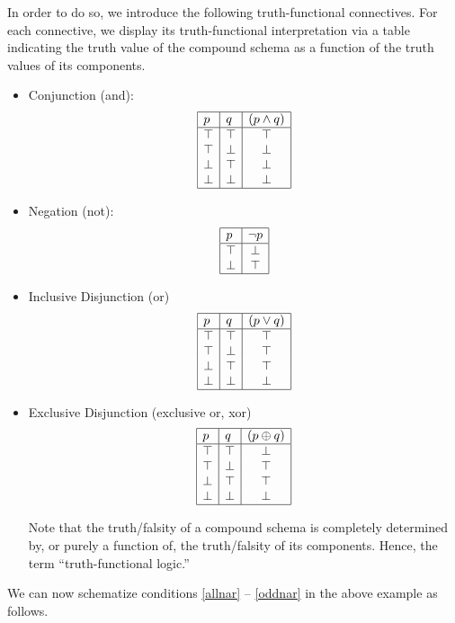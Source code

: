 In order to do so, we introduce the following truth-functional connectives. For each connective, we display its truth-functional interpretation via a table indicating the truth value of the compound schema as a function of the truth values of its components.
\begin{itemize}
\item Conjunction (and):
\[
\begin{array}{|l|l|c|} \hline
p   & q  &  (p \wedge q)   \\ \hline
\top & \top & \top  \\
\top & \bot & \bot  \\
\bot & \top & \bot  \\
\bot & \bot & \bot \\
\hline
\end{array}
\]
\item Negation (not):
\[
\begin{array}{|l|c|} \hline
p   &  \neg p    \\ \hline
\top & \bot  \\
\bot & \top  \\
\hline
\end{array}
\]
\item Inclusive Disjunction (or)
\[
\begin{array}{|l|l|c|} \hline
p   & q  &  (p \vee q)   \\ \hline
\top & \top & \top  \\
\top & \bot & \top  \\
\bot & \top & \top  \\   
\bot & \bot & \bot \\
\hline
\end{array}
\]

\item Exclusive Disjunction (exclusive or, xor)
\[
\begin{array}{|l|l|c|} \hline
p   & q  &  (p \oplus q)   \\ \hline
\top & \top & \bot  \\
\top & \bot & \top  \\
\bot & \top & \top  \\
\bot & \bot & \bot  \\
\hline
\end{array}
\]


Note that the truth/falsity of a compound schema is completely determined by, or purely a function of, the truth/falsity of its components. Hence, the term ``truth-functional logic.''

\end{itemize}
We can now schematize conditions \ref{allnar} -- \ref{oddnar} in the above example as follows.

